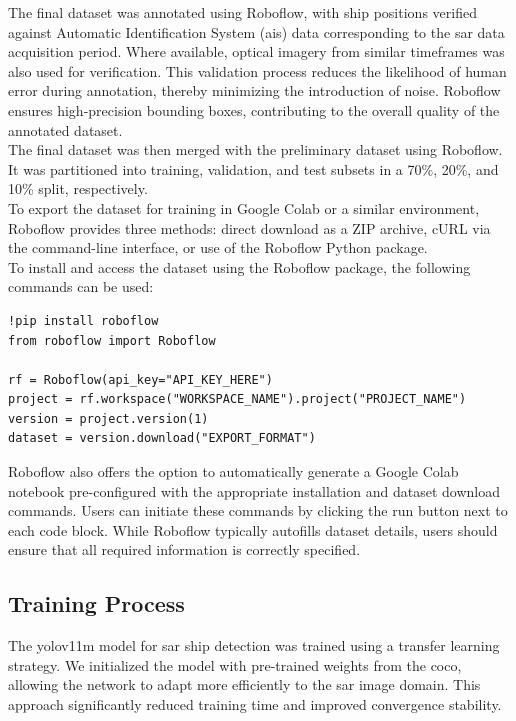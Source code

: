 \documentclass{article}
\begin{document}
The final dataset was annotated using Roboflow, with ship positions verified against Automatic Identification System (\acrshort{ais}) data corresponding to the \acrshort{sar} data acquisition period. Where available, optical imagery from similar timeframes was also used for verification. This validation process reduces the likelihood of human error during annotation, thereby minimizing the introduction of noise. Roboflow ensures high-precision bounding boxes, contributing to the overall quality of the annotated dataset.\\

The final dataset was then merged with the preliminary dataset using Roboflow. It was partitioned into training, validation, and test subsets in a 70\%, 20\%, and 10\% split, respectively.\\

To export the dataset for training in Google Colab or a similar environment, Roboflow provides three methods: direct download as a ZIP archive, cURL via the command-line interface, or use of the Roboflow Python package. \\

To install and access the dataset using the Roboflow package, the following commands can be used:
\begin{lstlisting}
!pip install roboflow
from roboflow import Roboflow

rf = Roboflow(api_key="API_KEY_HERE")
project = rf.workspace("WORKSPACE_NAME").project("PROJECT_NAME")
version = project.version(1)
dataset = version.download("EXPORT_FORMAT")
\end{lstlisting}
Roboflow also offers the option to automatically generate a Google Colab notebook pre-configured with the appropriate installation and dataset download commands. Users can initiate these commands by clicking the run button next to each code block. While Roboflow typically autofills dataset details, users should ensure that all required information is correctly specified. \subsection{Training Process}
The \acrshort{yolov11m} model for \acrshort{sar} ship detection was trained using a transfer learning strategy. We initialized the model with pre-trained weights from the \acrshort{coco}, allowing the network to adapt more efficiently to the \acrshort{sar} image domain. This approach significantly reduced training time and improved convergence stability.\\
\end{document}

